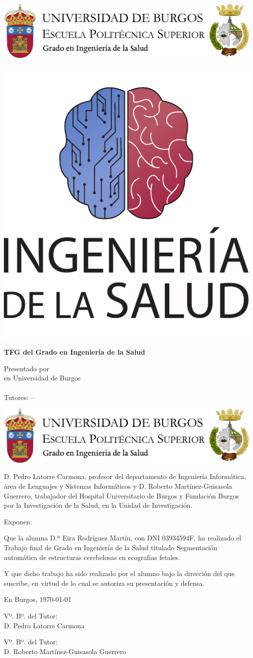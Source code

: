 \documentclass[a4paper,12pt,twoside]{memoir}
\title{\titulo}
\author{\nombre}
\date{\today}
\makeatletter
\def\maketitle{
  \null
  \thispagestyle{empty}
\begin{center}
  \noindent\includegraphics[width=\textwidth]{cabeceraSalud}\vspace{1.5cm}%
\end{center}
  
  \begin{center}
    \begin{minipage}[c][1.5cm][c]{.20\textwidth}
        \includegraphics[width=\textwidth]{escudoSalud.pdf}
    \end{minipage}
  \end{center}
  
  \begin{center}
    \colorbox{cpardoBox}{%
        \begin{minipage}{.8\textwidth}
          \vspace{.5cm}\Large
          \begin{center}
          \textbf{TFG del Grado en Ingeniería de la Salud}\vspace{.6cm}\\
          \textbf{\LARGE\@title{}}
          \end{center}
          \vspace{.2cm}
        \end{minipage}
    }%
  \end{center}
  
  \begin{center}%
  {%
    \noindent\LARGE
    Presentado por \@author{}\\ 
    en Universidad de Burgos\\
    \vspace{0.5cm}
    \noindent\Large
    \@date{}\\
    \vspace{0.5cm}
    Tutores: \@tutor{} -- \@tutorb{}\\
  }%
  \end{center}%
  \null
  \cleardoublepage
  }
\newcommand{\titulo}{Segmentación automática de estructuras cerebelosas en ecografías fetales}
\newcommand{\nombreTutor}{Pedro Latorre Carmona}
\newcommand{\nombreTutorb}{Roberto Martínez-Guisasola Guerrero}
\newcommand{\dni}{03934594F}
\makeatother
\begin{document}
\maketitle

\thispagestyle{empty}


\noindent\includegraphics[width=\textwidth]{cabeceraSalud}\vspace{1cm}

\noindent D. \nombreTutor, profesor del departamento de Ingeniería Informática, área de Lenguajes y Sistemas Informáticos y \noindent D. \nombreTutorb, trabajador del Hospital Universitario de Burgos y Fundación Burgos por la Investigación de la Salud, en la Unidad de Investigación.

\noindent Exponen:

\noindent Que la alumna D.ª Eira Rodríguez Martín, con DNI \dni, ha realizado el Trabajo final de Grado en Ingeniería de la Salud titulado \titulo. 

\noindent Y que dicho trabajo ha sido realizado por el alumno bajo la dirección del que suscribe, en virtud de lo cual se autoriza su presentación y defensa.

\begin{center} %
En Burgos, {\large \today}
\end{center}

\vfill\vfill\vfill

\begin{minipage}{0.45\textwidth}
\begin{flushleft} %
Vº. Bº. del Tutor:\\[2cm]
D. \nombreTutor
\end{flushleft}
\end{minipage}
\hfill
\begin{minipage}{0.45\textwidth}
\begin{flushleft} %
Vº. Bº. del Tutor:\\[2cm]
D. \nombreTutorb
\end{flushleft}
\end{minipage}
\hfill
\end{document}
